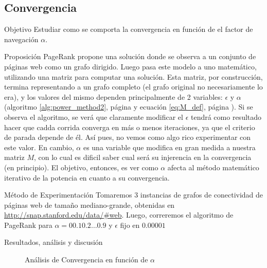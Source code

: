 \subsection{Convergencia}
\label{subsec:exp3}
\begin{LaTeXdescription}
    \item[Objetivo] Estudiar como se comporta la convergencia en funci\'on de
        el factor de navegaci\'on $\alpha$.

    \item[Proposici\'on] PageRank propone una soluci\'on donde se observa a un
        conjunto de p\'aginas web como un grafo dirigido. Luego pasa este modelo
        a uno  matem\'atico, utilizando una matriz para computar una soluci\'on.
        Esta matriz, por construcci\'on, termina representando a un grafo
        completo (el grafo original no necesariamente lo era), y los valores del
        mismo dependen principalmente de 2 variables: $\epsilon$ y $\alpha$
        (algoritmo \ref{alg:power_method2}, p\'agina \pageref{alg:power_method2}
        y ecuaci\'on \ref{eq:M_def}, p\'agina \pageref{eq:M_def}). Si se observa
        el algoritmo, se ver\'a que claramente modificar el $\epsilon$ tendr\'a
        como resultado hacer que cadda corrida converga en m\'as o menos
        iteraciones, ya que el criterio de parada depende de \'el. As\'i pues,
        no vemos como algo rico experimentar con este valor. En cambio, $\alpha$
        es una variable que modifica en gran medida a nuestra matriz $M$, con lo
        cual es dificil saber cual ser\'a su injerencia en la convergencia (en
        principio). El objetivo, entonces, es ver como $\alpha$ afecta al
        m\'etodo matem\'atico iterativo de la potencia en cuanto a su
        convergencia.

    \item[M\'etodo de Experimentaci\'on] Tomaremos 3 instancias de grafos de
        conectividad de p\'aginas web de tama\~no mediano-grande, obtenidas en
        \url{http://snap.stanford.edu/data/\#web}. Luego, correremos el
        algoritmo de PageRank para $\alpha=0 0.1 0.2 \dots 0.9$ y $\epsilon$
        fijo en $0.00001$

    \item[Resultados, an\'alisis y discusi\'on]
\end{LaTeXdescription}

\begin{figure}[!h]
    \centering
    \caption{An\'alisis de Convergencia en funci\'on de $\alpha$}
\end{figure}
